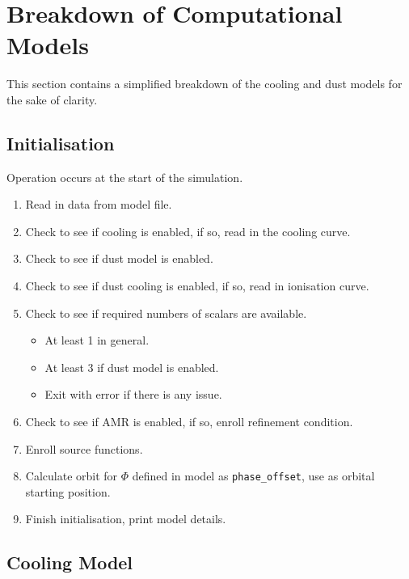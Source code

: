 
\chapter{Breakdown of Computational Models}

This section contains a simplified breakdown of the cooling and dust models for the sake of clarity.

\section{Initialisation}

Operation occurs at the start of the simulation.

\begin{enumerate}
  \item Read in data from model file.
  \item Check to see if cooling is enabled, if so, read in the cooling curve.
  \item Check to see if dust model is enabled.
  \item Check to see if dust cooling is enabled, if so, read in ionisation curve.
  \item Check to see if required numbers of scalars are available.
  \begin{itemize}
    \item At least 1 in general.
    \item At least 3 if dust model is enabled.
    \item Exit with error if there is any issue.
  \end{itemize}
  \item Check to see if AMR is enabled, if so, enroll refinement condition.
  \item Enroll source functions.
  \item Calculate orbit for $\Phi$ defined in model as \texttt{phase\_offset}, use as orbital starting position.
  \item Finish initialisation, print model details.
\end{enumerate}

\section{Cooling Model}

